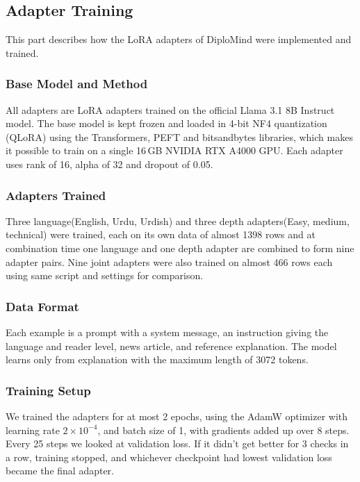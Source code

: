 \documentclass{FastFyp}
\begin{document}
\subsection{Adapter Training}
\label{subsec:impl-adapters}
This part describes how the LoRA adapters of DiploMind were implemented and trained. 

\subsubsection{Base Model and Method}
All adapters are LoRA adapters trained on the official Llama 3.1 8B Instruct model. The base model is kept frozen and loaded in 4-bit NF4 quantization (QLoRA) using the Transformers, PEFT and bitsandbytes libraries, which makes it possible to train on a single 16\,GB NVIDIA RTX A4000 GPU. Each adapter uses rank of 16, alpha of 32 and dropout of 0.05.

\subsubsection{Adapters Trained}
Three language(English, Urdu, Urdish) and three depth adapters(Easy, medium, technical) were trained, each on its own data of almost 1398 rows and at combination time one language and one depth adapter are combined to form nine adapter pairs. Nine joint adapters were also trained on almost 466 rows each using same script and settings for comparison.

\subsubsection{Data Format}
Each example is a prompt with a system message, an instruction giving the language and reader level, news article, and reference explanation. The model learns only from explanation with the maximum length of 3072 tokens. %

\subsubsection{Training Setup}
We trained the adapters for at most 2 epochs, using the AdamW optimizer with learning rate $2\times10^{-4}$, and batch size of 1, with gradients added up over 8 steps. Every 25 steps we looked at validation loss. If it didn’t get better for 3 checks in a row, training stopped, and whichever checkpoint had lowest validation loss became the final adapter.
\end{document}
